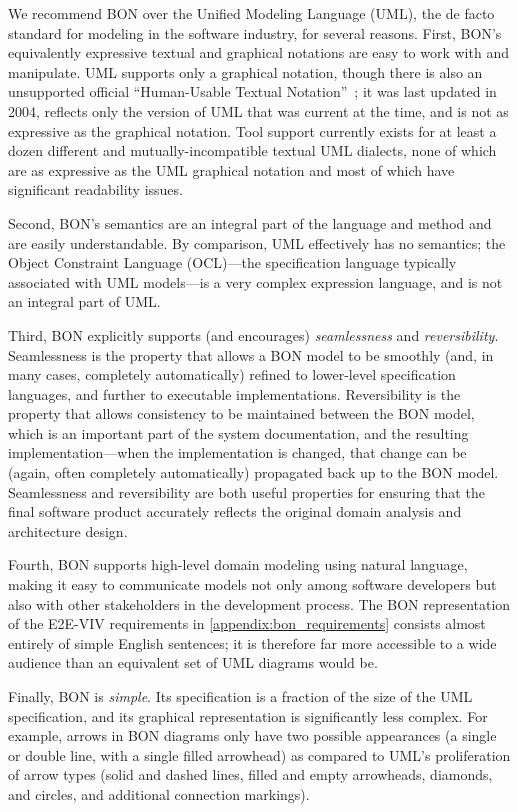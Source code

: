 We recommend BON over the Unified Modeling Language (UML), the de
facto standard for modeling in the software industry, for several
reasons. First, BON's equivalently expressive textual and graphical
notations are easy to work with and manipulate. UML supports only a
graphical notation, though there is also an unsupported official
``Human-Usable Textual Notation''~\cite{HUTN}; it was last updated in
2004, reflects only the version of UML that was current at the time,
and is not as expressive as the graphical notation. Tool support
currently exists for at least a dozen different and
mutually-incompatible textual UML dialects, none of which are as
expressive as the UML graphical notation and most of which have
significant readability issues.

Second, BON's semantics are an integral part of the language and
method and are easily understandable. By comparison, UML effectively
has no semantics; the Object Constraint Language (OCL)---the
specification language typically associated with UML models---is a
very complex expression language, and is not an integral part of UML.

Third, BON explicitly supports (and encourages) \emph{seamlessness}
and \emph{reversibility}. Seamlessness is the property that allows a
BON model to be smoothly (and, in many cases, completely
automatically) refined to lower-level specification languages, and
further to executable implementations. Reversibility is the property
that allows consistency to be maintained between the BON model, which
is an important part of the system documentation, and the resulting
implementation---when the implementation is changed, that change can
be (again, often completely automatically) propagated back up to the
BON model. Seamlessness and reversibility are both useful properties
for ensuring that the final software product accurately reflects the
original domain analysis and architecture design.

Fourth, BON supports high-level domain modeling using natural
language, making it easy to communicate models not only among software
developers but also with other stakeholders in the development
process. The BON representation of the E2E-VIV requirements in
\autoref{appendix:bon_requirements} consists almost entirely of simple
English sentences; it is therefore far more accessible to a wide
audience than an equivalent set of UML diagrams would be.

Finally, BON is \emph{simple}. Its specification is a fraction of the
size of the UML specification, and its graphical representation is
significantly less complex. For example, arrows in BON diagrams only
have two possible appearances (a single or double line, with a single
filled arrowhead) as compared to UML's proliferation of arrow types
(solid and dashed lines, filled and empty arrowheads, diamonds, and
circles, and additional connection markings). 

